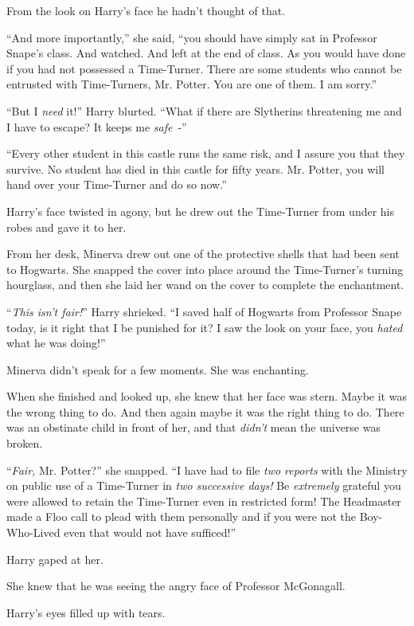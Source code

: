 From the look on Harry's face he hadn't thought of that.

``And more importantly,'' she said, ``you should have simply sat in Professor Snape's class. And watched. And left at the end of class. As you would have done if you had not possessed a Time-Turner. There are some students who cannot be entrusted with Time-Turners, Mr. Potter. You are one of them. I am sorry.''

``But I \emph{need} it!'' Harry blurted. ``What if there are Slytherins threatening me and I have to escape? It keeps me \emph{safe}~-''

``Every other student in this castle runs the same risk, and I assure you that they survive. No student has died in this castle for fifty years. Mr. Potter, you will hand over your Time-Turner and do so now.''

Harry's face twisted in agony, but he drew out the Time-Turner from under his robes and gave it to her.

From her desk, Minerva drew out one of the protective shells that had been sent to Hogwarts. She snapped the cover into place around the Time-Turner's turning hourglass, and then she laid her wand on the cover to complete the enchantment.

``\emph{This isn't fair!}'' Harry shrieked. ``I saved half of Hogwarts from Professor Snape today, is it right that I be punished for it? I saw the look on your face, you \emph{hated} what he was doing!''

Minerva didn't speak for a few moments. She was enchanting.

When she finished and looked up, she knew that her face was stern. Maybe it was the wrong thing to do. And then again maybe it was the right thing to do. There was an obstinate child in front of her, and that \emph{didn't} mean the universe was broken.

``\emph{Fair,} Mr. Potter?'' she snapped. ``I have had to file \emph{two reports} with the Ministry on public use of a Time-Turner in \emph{two successive days!} Be \emph{extremely} grateful you were allowed to retain the Time-Turner even in restricted form! The Headmaster made a Floo call to plead with them personally and if you were not the Boy-Who-Lived even that would not have sufficed!''

Harry gaped at her.

She knew that he was seeing the angry face of Professor McGonagall.

Harry's eyes filled up with tears.

